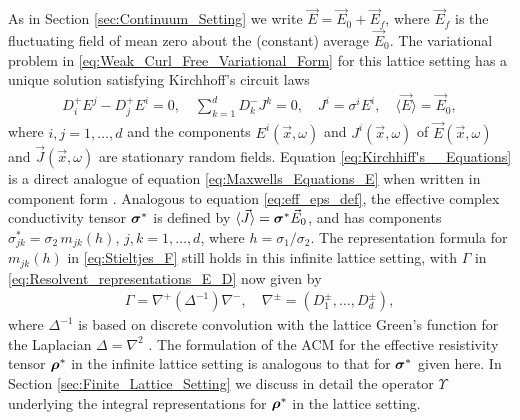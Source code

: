 \documentclass{cmslatex}
\newcommand\bsig{\mbox{\boldmath${\sigma}$}}
\newcommand\brho{\mbox{\boldmath${\rho}$}}
\begin{document}
As in Section \ref{sec:Continuum_Setting} we write
$\vec{E}=\vec{E}_0+\vec{E}_f$, where $\vec{E}_f$ is the fluctuating
field of mean zero about the (constant) average $\vec{E}_0$. 
The variational problem in \eqref{eq:Weak_Curl_Free_Variational_Form}
for this lattice setting has a unique solution satisfying Kirchhoff's
circuit laws \cite{Golden:CMP-473,Bruno:JSP-365}      
%
\begin{align}\label{eq:Kirchhiff's__Equations}
  D_i^+E^j-D_j^+E^i=0, \quad
  \sum_{k=1}^dD_k^-J^k=0, \quad
  J^i=\sigma^iE^i, \quad
  \langle\vec{E}\rangle=\vec{E}_0,
\end{align}
%
where $i,j=1,\ldots,d$ and the components $E^i(\vec{x},\omega)$ and
$J^i(\vec{x},\omega)$ of $\vec{E}(\vec{x},\omega)$ and $\vec{J}(\vec{x},\omega)$ are
stationary random fields.  
Equation \eqref{eq:Kirchhiff's__Equations} is a direct analogue of
equation \eqref{eq:Maxwells_Equations_E} when written in component
form \cite{Golden:CMP-473}. Analogous to equation
\eqref{eq:eff_eps_def}, the effective complex 
conductivity tensor $\bsig^*$ is defined by
$\langle\vec{J}\rangle=\bsig^*\vec{E}_0$, and has components
$\sigma^*_{jk}=\sigma_2\,m_{jk}(h)$, $j,k=1,\ldots,d$, where $h=\sigma_1/\sigma_2$. The
representation formula for $m_{jk}(h)$ in \eqref{eq:Stieltjes_F}
still holds in this infinite lattice setting,  
with $\Gamma$ in \eqref{eq:Resolvent_representations_E_D} now given by 
%
\begin{align}\label{eq:Discrete_Gamma}
  \Gamma=\nabla^+(\Delta^{-1})\nabla^-, \quad \nabla^\pm = (D_1^\pm,\ldots,D_d^\pm),
\end{align}
%
where $\Delta^{-1}$ is based on discrete convolution with the lattice
Green's function for the Laplacian $\Delta=\nabla^2$ \cite{Bruno:JSP-365}. The
formulation of the ACM for the effective resistivity tensor $\brho^*$
in the infinite lattice setting is analogous to that for $\bsig^*$
given here. In Section \ref{sec:Finite_Lattice_Setting} we discuss in
detail the operator $\Upsilon$ underlying the integral representations for
$\brho^*$ in the lattice setting. 
\end{document}
